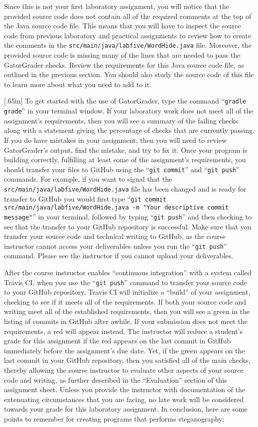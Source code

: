 \documentclass[11pt]{article}
\newcommand{\mainprogramsource}{\lstinline{src/main/java/labfive/WordHide.java}}
\newcommand{\gatorgraderstart}{\command{gradle grade}}
\newcommand{\gitcommit}{\command{git commit}}
\newcommand{\gitpush}{\command{git push}}
\newcommand{\gitcommitmainprogram}{\command{git commit src/main/java/labfive/WordHide.java -m "Your
descriptive commit message"}}
\newcommand{\command}[1]{``\lstinline{#1}''}
\newcommand{\step}[1]{``{#1}''}
\newcommand{\caution}[1]{\null\hfill\LARGE{\faWarning{}}\newline\scriptsize{\em{#1}}}
\newcommand{\checkmark}{\ding{51}}
\newcommand{\naughtmark}{\ding{55}}
\begin{document}
Since this is not your first laboratory assignment, you will notice that the
provided source code does not contain all of the required comments at the top of
the Java source code file. This means that you will have to inspect the source
code from previous laboratory and practical assignments to review how to create
the comments in the \mainprogramsource{} file. Moreover, the provided source
code is missing many of the lines that are needed to pass the GatorGrader
checks. Review the requirements for this Java source code file, as outlined in
the previous section. You should also study the source code of this file to
learn more about what you need to add to it.

\marginnote{\caution{Transfer to GitHub}}[.65in] To get started with the use of
GatorGrader, type the command \gatorgraderstart{} in your terminal window. If
your laboratory work does not meet all of the assignment's requirements, then
you will see a summary of the failing checks along with a statement giving the
percentage of checks that are currently passing. If you do have mistakes in your
assignment, then you will need to review GatorGrader's output, find the mistake,
and try to fix it. Once your program is building correctly, fulfilling at least
some of the assignment's requirements, you should transfer your files to GitHub
using the \gitcommit{} and \gitpush{} commands. For example, if you want to
signal that the \mainprogramsource{} file has been changed and is ready for
transfer to GitHub you would first type \gitcommitmainprogram{} in your
terminal, followed by typing \gitpush{} and then checking to see that the
transfer to your GitHub repository is successful. Make sure that you transfer
your source code and technical writing to GitHub, as the course instructor
cannot access your deliverables unless you run the \gitpush{} command. Please
see the instructor if you cannot upload your deliverables.

After the course instructor enables \step{continuous integration} with a system
called Travis CI, when you use the \gitpush{} command to transfer your source
code to your GitHub repository, Travis CI will initialize a \step{build} of your
assignment, checking to see if it meets all of the requirements. If both your
source code and writing meet all of the established requirements, then you will
see a green \checkmark{} in the listing of commits in GitHub after awhile. If
your submission does not meet the requirements, a red \naughtmark{} will appear
instead. The instructor will reduce a student's grade for this assignment if the
red \naughtmark{} appears on the last commit in GitHub immediately before the
assignment's due date. Yet, if the green \checkmark{} appears on the last commit
in your GitHub repository, then you satisfied all of the main checks, thereby
allowing the course instructor to evaluate other aspects of your source code and
writing, as further described in the \step{Evaluation} section of this
assignment sheet. Unless you provide the instructor with documentation of the
extenuating circumstances that you are facing, no late work will be considered
towards your grade for this laboratory assignment. In conclusion, here are some
points to remember for creating programs that performs steganography:
\end{document}

